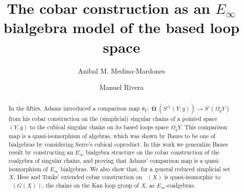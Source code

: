 \documentclass{amsart}
\newcommand{\simplex}{\triangle}
\newcommand{\cube}{\square}
\DeclareMathOperator{\schains}{N^{\simplex}}
\DeclareMathOperator{\cobar}{\mathbf{\Omega}}
\theoremstyle{definition}
\begin{document}
\title{The cobar construction as an $E_\infty$ bialgebra model of the based loop space}
\author{Anibal M. Medina-Mardones}
\address{Max Plank Institute for Mathematics, Bonn, Germany}
\address{Department of Mathematics, University of Notre Dame, Notre Dame, IN, USA}
\author{Manuel Rivera}
\address{Department of Mathematics, Purdue University, West Lafayette, IN, USA}


\begin{abstract}
    In the fifties, Adams introduced a comparison map $\theta_Y \colon \cobar(S^\simplex(Y,y)) \to S^\cube(\Omega_y Y)$ from his cobar construction on the (simplicial) singular chains of a pointed space $(Y, y)$ to the cubical singular chains on its based loops space $\Omega_y Y$.
	This comparison map is a quasi-isomorphism of algebras, which was shown by Baues to be one of bialgebras by considering Serre's cubical coproduct.
	In this work we generalize Baues result by constructing an $E_\infty$ bialgebra structure on the cobar construction of the coalgebra of singular chains, and proving that Adams' comparison map is a quasi-isomorphism of $E_\infty$ bialgebras.
	We also show that, for a general reduced simplicial set $X$, Hess and Tonks' extended cobar construction on $\schains(X)$ is quasi-isomorphic to $\schains(G(X))$, the chains on the Kan loop group of $X$, as $E_{\infty}$-coalgebras. 
\end{abstract}

\vspace*{-1cm}

\maketitle
\setcounter{tocdepth}{1}
\tableofcontents








\end{document}
